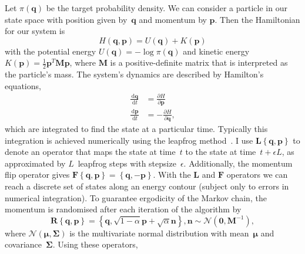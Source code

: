 \documentclass{article}
\newcommand{\dd}{\, \mathrm{d}}
\renewcommand{\vec}[1]{\ensuremath{\boldsymbol{\mathbf{#1}}}}
\newcommand{\mat}[1]{\ensuremath{\boldsymbol{\mathbf{#1}}}}
\newcommand{\op}[1]{\ensuremath{\boldsymbol{\mathbf{#1}}}}
\newcommand{\norm}{\ensuremath{\mathcal{N}}}
\begin{document}
    Let $\pi\left(\vec{q}\right)$ be the target probability density.
    We can consider a particle in our state space with position given
        by~$\vec{q}$ and momentum by $\vec{p}$.
    Then the Hamiltonian for our system is
        \begin{equation}
            H\left(\vec{q},\vec{p}\right)
            = U\left(\vec{q}\right) + K\left(\vec{p}\right)
        \end{equation}
        with the potential energy
        $U\left(\vec{q}\right) = -\log{\pi\left(\vec{q}\right)}$ and kinetic
        energy $K\left(\vec{p}\right) = \frac{1}{2} \vec{p}^T \mat{M} \vec{p}$,
        where $\mat{M}$ is a positive-definite matrix that is interpreted as
        the particle's mass.
    The system's dynamics are described by Hamilton's equations,
        \begin{align}
            \frac{\dd \vec{q}}{\dd t} &= \frac{\partial H}{\partial \vec{p}} \\
            \frac{\dd \vec{p}}{\dd t} &= -\frac{\partial H}{\partial \vec{q}},
        \end{align}
        which are integrated to find the state at a particular time.
    Typically this integration is achieved numerically using the leapfrog
        method~\cite{Nea11}.
    I use $\op{L}\left\{\vec{q},\vec{p}\right\}$ to denote an operator that
        maps the state at time~$t$ to the state at time~$t + \epsilon L$, as
        approximated by $L$~leapfrog steps with stepsize~$\epsilon$.
    Additionally, the momentum flip operator gives
        $\op{F}\left\{\vec{q},\vec{p}\right\}
         = \left\{\vec{q},-\vec{p}\right\}$.
    With the $\op{L}$ and $\op{F}$ operators we can reach a discrete set of
        states along an energy contour (subject only to errors in numerical
        integration).
    To guarantee ergodicity of the Markov chain, the momentum is randomised
        after each iteration of the algorithm by
        \begin{equation}
            \op{R}\left\{\vec{q},\vec{p}\right\} =
            \left\{\vec{q}, \sqrt{1-\alpha}\vec{p} + \sqrt{\alpha}\vec{n}\right\},
            \vec{n} \sim \norm\left(\vec{0}, \mat{M}^{-1}\right),
        \end{equation}
        where $\norm\left(\vec{\mu},\mat{\Sigma}\right)$ is the multivariate
        normal distribution with mean~$\vec{\mu}$ and covariance~$\mat{\Sigma}$.
    Using these operators,
\end{document}
